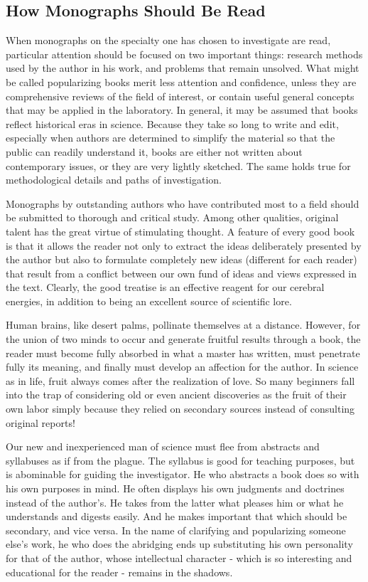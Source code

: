 \documentclass{article}
\begin{document}
\subsection*{How Monographs Should Be Read}

When monographs on the specialty one has chosen to investigate are read, particular attention should be focused on two important things: research methods used by the author in his work, and problems that remain unsolved. What might be called popularizing books merit less attention and confidence, unless they are comprehensive reviews of the field of interest, or contain useful general concepts that may be applied in the laboratory. In general, it may be assumed that books reflect historical eras in science. Because they take so long to write and edit, especially when authors are determined to simplify the material so that the public can readily understand it, books are either not written about contemporary issues, or they are very lightly sketched. The same holds true for methodological details and paths of investigation.

Monographs by outstanding authors who have contributed most to a field should be submitted to thorough and critical study. Among other qualities, original talent has the great virtue of stimulating thought. A feature of every good book is that it allows the reader not only to extract the ideas deliberately presented by the author but also to formulate completely new ideas (different for each reader) that result from a conflict between our own fund of ideas and views expressed in the text. Clearly, the good treatise is an effective reagent for our cerebral energies, in addition to being an excellent source of scientific lore.

Human brains, like desert palms, pollinate themselves at a distance. However, for the union of two minds to occur and generate fruitful results through a book, the reader must become fully absorbed in what a master has written, must penetrate fully its meaning, and finally must develop an affection for the author. In science as in life, fruit always comes after the realization of love. So many beginners fall into the trap of considering old or even ancient discoveries as the fruit of their own labor simply because they relied on secondary sources instead of consulting original reports!

Our new and inexperienced man of science must flee from abstracts and syllabuses as if from the plague. The syllabus is good for teaching purposes, but is abominable for guiding the investigator. He who abstracts a book does so with his own purposes in mind. He often displays his own judgments and doctrines instead of the author’s. He takes from the latter what pleases him or what he understands and digests easily. And he makes important that which should be secondary, and vice versa. In the name of clarifying and popularizing someone else’s work, he who does the abridging ends up substituting his own personality for that of the author, whose intellectual character - which is so interesting and educational for the reader - remains in the shadows.
\end{document}
